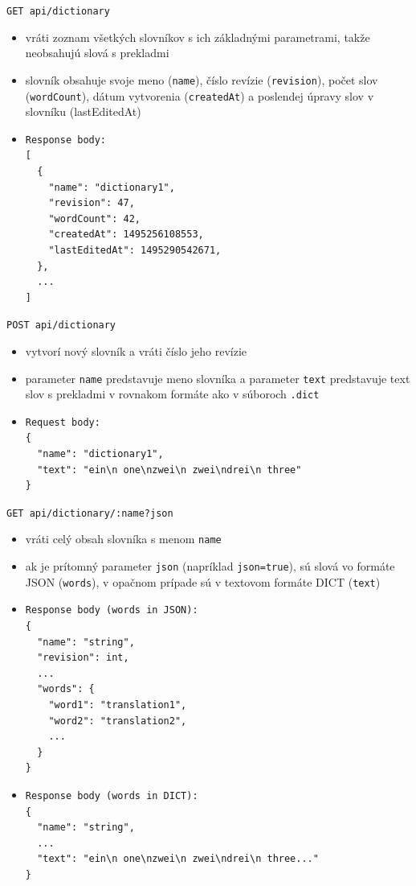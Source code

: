 \documentclass[
  digital, %
  table,   %
  lof,     %
  lot,     %
]{fithesis3}
\begin{document}
\noindent
\texttt{GET api/dictionary}
\begin{itemize}
\item vráti zoznam všetkých slovníkov s ich základnými parametrami, takže neobsahujú slová s prekladmi
\item slovník obsahuje svoje meno (\texttt{name}), číslo revízie (\texttt{revision}), počet slov (\texttt{wordCount}), dátum vytvorenia (\texttt{createdAt}) a poslendej úpravy slov v slovníku (lastEditedAt)
\item \begin{lstlisting}[basicstyle=\small]
Response body:
[
  {
  	"name": "dictionary1",
  	"revision": 47,
    "wordCount": 42,
    "createdAt": 1495256108553,
    "lastEditedAt": 1495290542671,
  },
  ...
]
\end{lstlisting}
\end{itemize}

\noindent
\texttt{POST api/dictionary}
\begin{itemize}
\item vytvorí nový slovník a vráti číslo jeho revízie
\item parameter \texttt{name} predstavuje meno slovníka a parameter \texttt{text} predstavuje text slov s prekladmi v rovnakom formáte ako v súboroch \texttt{.dict}
\item \begin{lstlisting}[basicstyle=\small]
Request body:
{
  "name": "dictionary1",
  "text": "ein\n one\nzwei\n zwei\ndrei\n three"
}
\end{lstlisting}
\end{itemize}

\noindent
\texttt{GET api/dictionary/:name?json}
\begin{itemize}
\item vráti celý obsah slovníka s menom \texttt{name}
\item ak je prítomný parameter \texttt{json} (napríklad \texttt{json=true}), sú slová vo formáte JSON (\texttt{words}), v opačnom prípade sú v textovom formáte DICT (\texttt{text})
\item \begin{lstlisting}[basicstyle=\small]
Response body (words in JSON):
{
  "name": "string",
  "revision": int,
  ...
  "words": {
  	"word1": "translation1",
    "word2": "translation2",
    ...
  }
}
\end{lstlisting}
\item \begin{lstlisting}[basicstyle=\small]
Response body (words in DICT):
{
  "name": "string",
  ...
  "text": "ein\n one\nzwei\n zwei\ndrei\n three..."
}
\end{lstlisting}
\end{itemize}
\end{document}
